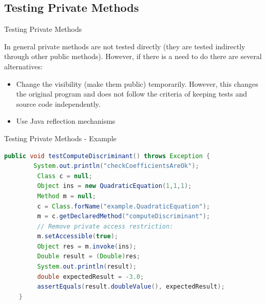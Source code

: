 \documentclass[11pt, xcolor=svgnames]{beamer}
\begin{document}

\subsection{Testing Private Methods}


\begin{frame}{Testing Private Methods}

In general private methods are not tested directly (they are tested indirectly through other public methods). However, if there is a need to do there are several alternatives:

\begin{itemize}
 \item Change the visibility (make them public) temporarily. However, this changes the original program and does not follow the criteria of keeping tests and source code independently.
 \item Use Java reflection mechanisms
\end{itemize}


\end{frame}


\begin{frame}[fragile]{Testing Private Methods - Example}

\begin{lstlisting}[language=Java,basicstyle=\tiny]
    public void testComputeDiscriminant() throws Exception {
        System.out.println("checkCoefficientsAreOk");
         Class c = null;
         Object ins = new QuadraticEquation(1,1,1);
         Method m = null;
         c = Class.forName("example.QuadraticEquation");
         m = c.getDeclaredMethod("computeDiscriminant");
         // Remove private access restriction:
         m.setAccessible(true);
         Object res = m.invoke(ins);
         Double result = (Double)res;
         System.out.println(result);
         double expectedResult = -3.0;
         assertEquals(result.doubleValue(), expectedResult);
    }
\end{lstlisting}

\end{frame}
\end{document}
